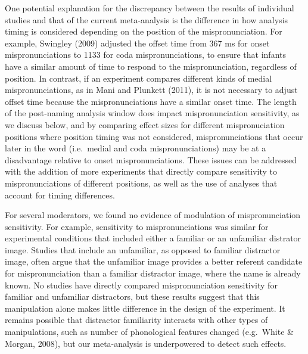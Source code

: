 \documentclass[man]{apa6}
\begin{document}
One potential explanation for the discrepancy between the results of individual studies and that of the current meta-analysis is the difference in how analysis timing is considered depending on the position of the mispronunciation. For example, Swingley (2009) adjusted the offset time from 367 ms for onset mispronunciations to 1133 for coda mispronunciations, to ensure that infants have a similar amount of time to respond to the mispronunciation, regardless of position. In contrast, if an experiment compares different kinds of medial mispronunciations, as in Mani and Plunkett (2011), it is not necessary to adjust offset time because the mispronunciations have a similar onset time. The length of the post-naming analysis window does impact mispronunciation sensitivity, as we discuss below, and by comparing effect sizes for different mispronuciation positions where position timing was not considered, mispronunciations that occur later in the word (i.e.~medial and coda mispronunciations) may be at a disadvantage relative to onset mispronunciations. These issues can be addressed with the addition of more experiments that directly compare sensitivity to mispronunciations of different positions, as well as the use of analyses that account for timing differences.

For several moderators, we found no evidence of modulation of mispronunciation sensitivity. For example, sensitivity to mispronunciations was similar for experimental conditions that included either a familiar or an unfamiliar distrator image. Studies that include an unfamiliar, as opposed to familiar distractor image, often argue that the unfamiliar image provides a better referent candidate for mispronunciation than a familiar distractor image, where the name is already known. No studies have directly compared mispronunciation sensitivity for familiar and unfamiliar distractors, but these results suggest that this manipulation alone makes little difference in the design of the experiment. It remains possible that distractor familiarity interacts with other types of manipulations, such as number of phonological features changed (e.g.~White \& Morgan, 2008), but our meta-analysis is underpowered to detect such effects.
\end{document}
